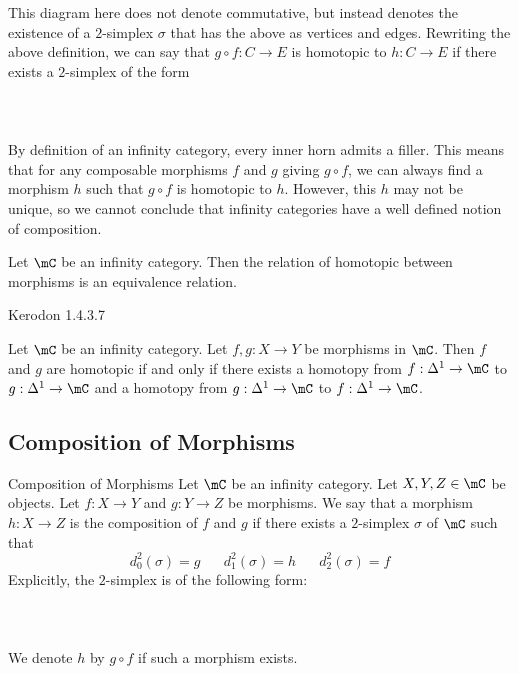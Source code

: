 \documentclass[a4paper]{article}
\begin{document}
This diagram here does not denote commutative, but instead denotes the existence of a $2$-simplex $\sigma$ that has the above as vertices and edges. Rewriting the above definition, we can say that $g\circ f:C\to E$ is homotopic to $h:C\to E$ if there exists a $2$-simplex of the form \\~\\
\\~\\
By definition of an infinity category, every inner horn admits a filler. This means that for any composable morphisms $f$ and $g$ giving $g\circ f$, we can always find a morphism $h$ such that $g\circ f$ is homotopic to $h$. However, this $h$ may not be unique, so we cannot conclude that infinity categories have a well defined notion of composition. 

\begin{lmm}{}{} Let $\mC$ be an infinity category. Then the relation of homotopic between morphisms is an equivalence relation. 
\end{lmm}

Kerodon 1.4.3.7

\begin{prp}{}{} Let $\mC$ be an infinity category. Let $f,g:X\to Y$ be morphisms in $\mC$. Then $f$ and $g$ are homotopic if and only if there exists a homotopy from $f:\Delta^1\to\mC$ to $g:\Delta^1\to\mC$ and a homotopy from $g:\Delta^1\to\mC$ to $f:\Delta^1\to\mC$. 
\end{prp}

\subsection{Composition of Morphisms}
\begin{defn}{Composition of Morphisms}{} Let $\mC$ be an infinity category. Let $X,Y,Z\in\mC$ be objects. Let $f:X\to Y$ and $g:Y\to Z$ be morphisms. We say that a morphism $h:X\to Z$ is the composition of $f$ and $g$ if there exists a $2$-simplex $\sigma$ of $\mC$ such that $$d_0^2(\sigma)=g\;\;\;\;\;\;d_1^2(\sigma)=h\;\;\;\;\;\;d_2^2(\sigma)=f$$ Explicitly, the $2$-simplex is of the following form: \\~\\
\\~\\
We denote $h$ by $g\circ f$ if such a morphism exists. 
\end{defn}
\end{document}
